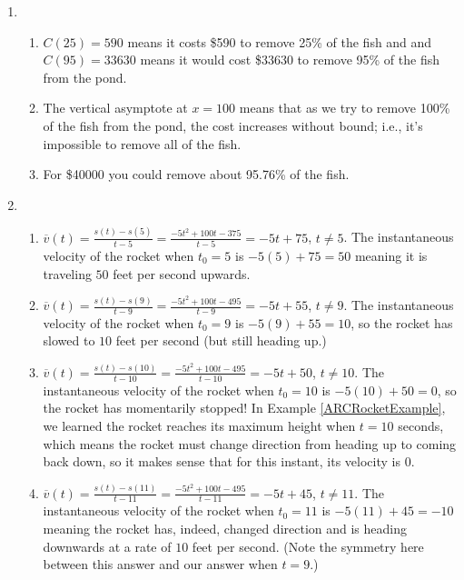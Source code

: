 \documentclass{ximera}
\begin{document}
\begin{enumerate}
\setcounter{enumi}{\value{HW}}


\item \begin{enumerate}

\item $C(25) = 590$ means it costs \$590 to remove 25\% of the fish and and $C(95)= 33630$ means it would cost \$33630 to remove 95\% of the fish from the pond.
\item The vertical asymptote at $x = 100$ means that as we try to remove 100\% of the fish from the pond, the cost increases without bound; i.e., it's impossible to remove all of the fish.
\item For \$40000 you could remove about 95.76\% of the fish.

\end{enumerate}

\item  \begin{enumerate}

\item  $\overline{v}(t) = \frac{s(t) - s(5)}{t - 5} = \frac{-5t^2+100t-375}{t-5} = -5t+75$, $t \neq 5$.  The instantaneous velocity of the rocket when $t_{0} = 5$ is $-5(5)+75 = 50$ meaning it is traveling $50$ feet per second upwards.

\item  $\overline{v}(t) = \frac{s(t) - s(9)}{t - 9} = \frac{-5t^2+100t-495}{t-9} = -5t+55$, $t \neq 9$.  The instantaneous velocity of the rocket when $t_{0} = 9$ is $-5(9)+55 = 10$, so the rocket has slowed to $10$ feet per second (but still heading up.)

\item $\overline{v}(t) = \frac{s(t) - s(10)}{t - 10} = \frac{-5t^2+100t-495}{t-10} = -5t+50$, $t \neq 10$.  The instantaneous velocity of the rocket when $t_{0} = 10$ is $-5(10)+50 = 0$, so the rocket has momentarily stopped!  In Example \ref{ARCRocketExample}, we learned the rocket reaches its maximum height when $t = 10$ seconds, which means the rocket must change direction from heading up to coming back down, so it makes sense that for this instant, its velocity is $0$.

\item  $\overline{v}(t) = \frac{s(t) - s(11)}{t - 11} = \frac{-5t^2+100t-495}{t-11} = -5t+45$, $t \neq 11$.  The instantaneous velocity of the rocket when $t_{0} = 11$ is $-5(11)+45 = -10$ meaning the rocket has, indeed, changed direction and is heading downwards at a rate of $10$ feet per second.  (Note the symmetry here between this answer and our answer when $t=9$.)


\end{enumerate}
\end{enumerate}
\end{document}
